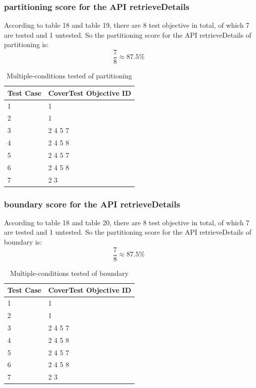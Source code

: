 \documentclass{article}
\begin{document}
\subsubsection{partitioning score for the API retrieveDetails}
According to table 18 and table 19, there are 8 test objective in total, of which 7 are tested and 1 untested. So the partitioning score for the API retrieveDetails of partitioning is:
$$\frac{7}{8}\approx87.5\%$$
\begin{longtable}{|p{2cm}|p{8cm}|}
\caption{Multiple-conditions tested of partitioning}\\
\hline 
Test Case& CoverTest Objective ID\\
\hline  
1&1\\
\hline
2&1\\
\hline
3&2 4 5 7\\
\hline
4&2 4 5 8\\
\hline
5&2 4 5 7\\
\hline
6&2 4 5 8\\
\hline
7&2 3\\
\hline
\end{longtable}
\subsubsection{boundary score for the API retrieveDetails}
According to table 18 and table 20, there are 8 test objective in total, of which 7 are tested and 1 untested. So the partitioning score for the API retrieveDetails of boundary is:
$$\frac{7}{8}\approx87.5\%$$
\begin{longtable}{|p{2cm}|p{8cm}|}
\caption{Multiple-conditions tested of boundary}\\
\hline 
Test Case& CoverTest Objective ID\\
\hline  
1&1\\
\hline
2&1\\
\hline
3&2 4 5 7\\
\hline
4&2 4 5 8\\
\hline
5&2 4 5 7\\
\hline
6&2 4 5 8\\
\hline
7&2 3\\
\hline
\end{longtable}
\enddocument
\end{document}
